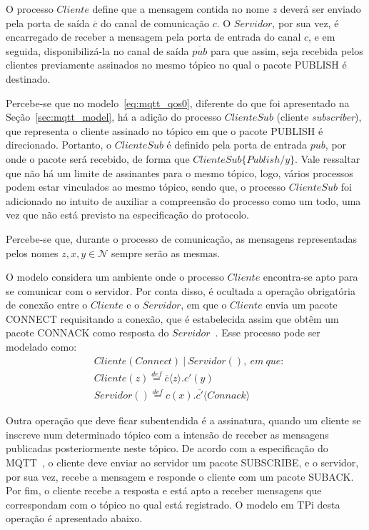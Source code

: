 O processo $Cliente$ define que a mensagem contida no nome $z$ deverá ser enviado pela porta de saída $\overline{c}$ do canal de comunicação $c$. O $Servidor$, por sua vez, é encarregado de receber a mensagem pela porta de entrada do canal $c$, e em seguida, disponibilizá-la no canal de saída $\overline{pub}$ para que assim, seja recebida pelos clientes previamente assinados no mesmo tópico no qual o pacote PUBLISH é destinado. 

Percebe-se que no modelo~\ref{eq:mqtt_qos0}, diferente do que foi apresentado na Seção~\ref{sec:mqtt_model}, há a adição do processo $ClienteSub$ (cliente \textit{subscriber}), que representa o cliente assinado no tópico em que o pacote PUBLISH é direcionado. Portanto, o $ClienteSub$ é definido pela porta de entrada $pub$, por onde o pacote será recebido, de forma que $ClienteSub\{Publish/y\}$. Vale ressaltar que não há um limite de assinantes para o mesmo tópico, logo, vários processos podem estar vinculados ao mesmo tópico, sendo que, o processo $ClienteSub$ foi adicionado no intuito de auxiliar a compreensão do processo como um todo, uma vez que não está previsto na especificação do protocolo.

Percebe-se que, durante o processo de comunicação, as mensagens representadas pelos nomes $z, x, y \in \mathcal{N}$ sempre serão as mesmas.

O modelo considera um ambiente onde o processo $Cliente$ encontra-se apto para se comunicar com o servidor. Por conta disso, é ocultada a operação obrigatória de conexão entre o $Cliente$ e o $Servidor$, em que o $Cliente$ envia um pacote CONNECT requisitando a conexão, que é estabelecida assim que obtêm um pacote CONNACK como resposta do $Servidor$~\cite{mqttv3.1.1}. Esse processo pode ser modelado como:
\begin{align}
& Cliente(Connect)~|~Servidor(),~em~que: \nonumber \\
& Cliente(z) \stackrel{def}{=} \overline{c}\langle z \rangle . c'(y) \nonumber \\
& Servidor() \stackrel{def}{=} c(x). \overline{c'}\langle Connack \rangle
\end{align}

Outra operação que deve ficar subentendida é a assinatura, quando um cliente se inscreve num determinado tópico com a intensão de receber as mensagens publicadas posteriormente neste tópico. De acordo com a especificação do MQTT~\cite{mqttv3.1.1}, o cliente deve enviar ao servidor um pacote SUBSCRIBE, e o servidor, por sua vez, recebe a mensagem e responde o cliente com um pacote SUBACK. Por fim, o cliente recebe a resposta e está apto a receber mensagens que correspondam com o tópico no qual está registrado. O modelo em TPi desta operação é apresentado abaixo.

